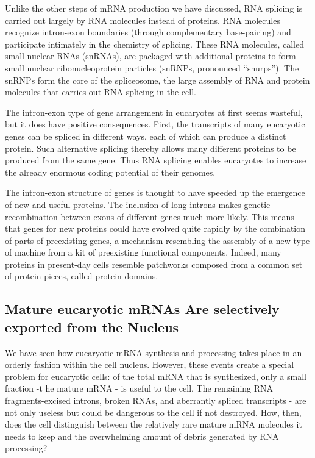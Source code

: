 Unlike the other steps of mRNA production we have discussed, RNA
splicing is carried out largely by RNA molecules instead of proteins. RNA
molecules recognize intron-exon boundaries (through complementary
base-pairing) and participate intimately in the chemistry of splicing.
These RNA molecules, called small nuclear RNAs (snRNAs), are packaged
with additional proteins to form small nuclear ribonucleoprotein
particles (snRNPs, pronounced “snurps”). The snRNPs form the core of
the spliceosome, the large assembly of RNA and protein molecules that
carries out RNA splicing in the cell.

The intron-exon type of gene arrangement in eucaryotes at first seems
wasteful, but it does have positive consequences. First, the transcripts of
many eucaryotic genes can be spliced in different ways, each of which
can produce a distinct protein. Such alternative splicing thereby allows
many different proteins to be produced from the same gene.
Thus RNA splicing enables eucaryotes to increase the already enormous
coding potential of their genomes.

The intron-exon structure of genes is thought to have speeded up the emergence of new and
useful proteins. The inclusion of long introns makes genetic recombination
between exons of different genes much more likely. This means that
genes for new proteins could have evolved quite rapidly by the combination
of parts of preexisting genes, a mechanism resembling the assembly
of a new type of machine from a kit of preexisting functional components.
Indeed, many proteins in present-day cells resemble patchworks
composed from a common set of protein pieces, called protein domains.

\subsection{Mature eucaryotic mRNAs Are selectively exported from the Nucleus}

We have seen how eucaryotic mRNA synthesis and processing takes
place in an orderly fashion within the cell nucleus. However, these events
create a special problem for eucaryotic cells: of the total mRNA that is
synthesized, only a small fraction -t he mature mRNA - is useful to the
cell. The remaining RNA fragments-excised introns, broken RNAs, and
aberrantly spliced transcripts - are not only useless but could be dangerous
to the cell if not destroyed. How, then, does the cell distinguish
between the relatively rare mature mRNA molecules it needs to keep and
the overwhelming amount of debris generated by RNA processing?

